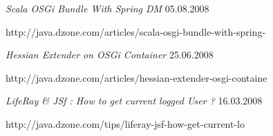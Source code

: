 \documentclass{res}
\begin{document}
\begin{resume}
{\sl Scala OSGi Bundle With Spring DM}  \hfill   05.08.2008	\\
\item[] http://java.dzone.com/articles/scala-osgi-bundle-with-spring-

{\sl Hessian Extender on OSGi Container}  \hfill    25.06.2008	\\
\item[] http://java.dzone.com/articles/hessian-extender-osgi-containe

{\sl LifeRay & JSf : How to get current logged User ?}  \hfill    16.03.2008	\\
\item[] http://java.dzone.com/tips/liferay-jsf-how-get-current-lo


\end{resume}
\end{document}
